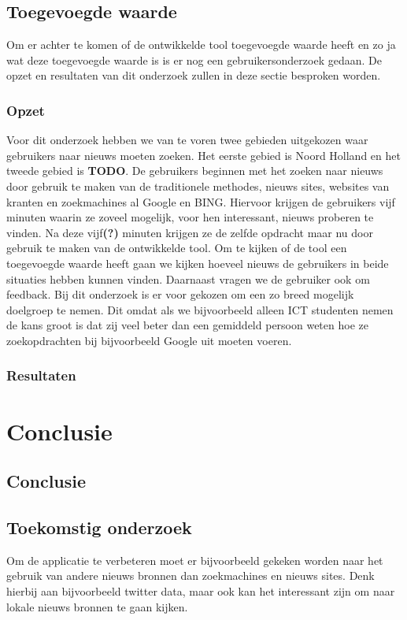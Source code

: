 \documentclass[twoside,openright]{uva-bachelor-thesis}
\begin{document}
	\section{Toegevoegde waarde}
		Om er achter te komen of de ontwikkelde tool toegevoegde waarde heeft en zo ja wat deze toegevoegde waarde is is er nog een gebruikersonderzoek gedaan. De opzet en resultaten van dit onderzoek zullen in deze sectie besproken worden.
		\subsection{Opzet}
			Voor dit onderzoek hebben we van te voren twee gebieden uitgekozen waar gebruikers naar nieuws moeten zoeken. Het eerste gebied is Noord Holland en het tweede gebied is \textbf{TODO}. De gebruikers beginnen met het zoeken naar nieuws door gebruik te maken van de traditionele methodes, nieuws sites, websites van kranten en zoekmachines al Google en BING. Hiervoor krijgen de gebruikers vijf minuten waarin ze zoveel mogelijk, voor hen interessant, nieuws proberen te vinden. Na deze vijf\textbf{(?)} minuten krijgen ze de zelfde opdracht maar nu door gebruik te maken van de ontwikkelde tool. Om te kijken of de tool een toegevoegde waarde heeft gaan we kijken hoeveel nieuws de gebruikers in beide situaties hebben kunnen vinden. Daarnaast vragen we de gebruiker ook om feedback. Bij dit onderzoek is er voor gekozen om een zo breed mogelijk doelgroep te nemen. Dit omdat als we bijvoorbeeld alleen ICT studenten nemen de kans groot is dat zij veel beter dan een gemiddeld persoon weten hoe ze zoekopdrachten bij bijvoorbeeld Google uit moeten voeren.
		\subsection{Resultaten}
	
\chapter{Conclusie}
	\section{Conclusie}
	\section{Toekomstig onderzoek}
		Om de applicatie te verbeteren moet er bijvoorbeeld gekeken worden naar het gebruik van andere nieuws bronnen dan zoekmachines en nieuws sites. Denk hierbij aan bijvoorbeeld twitter data, maar ook kan het interessant zijn om naar lokale nieuws bronnen te gaan kijken.
\end{document}
